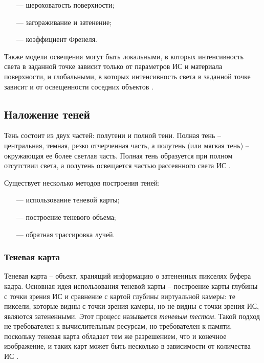 \begin{itemize}
	\item[---] шероховатость поверхности;
	\item[---] загораживание и затенение;
	\item[---] коэффициент Френеля.
\end{itemize}

Также модели освещения могут быть локальными, в которых интенсивность света в заданной точке зависит только от параметров ИС и материала поверхности, и глобальными, в которых интенсивность света в заданной точке зависит и от освещенности соседних объектов \cite{rogers}.

\subsection{Наложение теней}

Тень состоит из двух частей: полутени и полной тени. Полная тень -- центральная, темная, резко отчерченная часть, а полутень (или мягкая тень) -- окружающая ее более светлая часть. Полная тень образуется при полном отсутствии света, а полутень освещается частью рассеянного света ИС \cite{rogers}.

Существует несколько методов построения теней:

\begin{itemize}
	\item[---] использование теневой карты;
	\item[---] построение теневого объема;
	\item[---] обратная трассировка лучей.
\end{itemize}

\subsubsection*{Теневая карта}

Теневая карта -- объект, хранящий информацию о затененных пикселях буфера кадра. Основная идея использования теневой карты -- построение карты глубины с точки зрения ИС и сравнение с картой глубины виртуальной камеры: те пиксели, которые видны с точки зрения камеры, но не видны с точки зрения ИС, являются затененными. Этот процесс называется \textit{теневым тестом}. Такой подход не требователен к вычислительным ресурсам, но требователен к памяти, поскольку теневая карта обладает тем же разрешением, что и конечное изображение, и таких карт может быть несколько в зависимости от количества ИС \cite{engel2008programming}.


